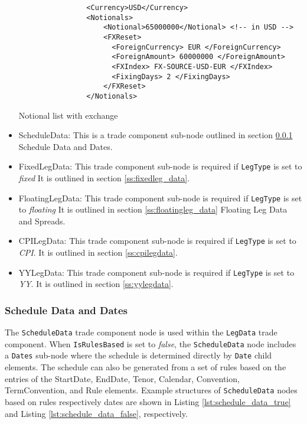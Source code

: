 \begin{itemize}
 \begin{listing}[H]
\begin{verbatim}
                <Currency>USD</Currency>
                <Notionals>
                    <Notional>65000000</Notional> <!-- in USD -->
                    <FXReset>
                      <ForeignCurrency> EUR </ForeignCurrency>
                      <ForeignAmount> 60000000 </ForeignAmount>
                      <FXIndex> FX-SOURCE-USD-EUR </FXIndex>
                      <FixingDays> 2 </FixingDays>
                    </FXReset>
                </Notionals>
\end{verbatim}
\caption{Notional list with exchange}
\label{lst:notional_fxreset}
\end{listing}


\item ScheduleData: This is a trade component sub-node outlined in section \ref{ss:schedule_data} Schedule Data and
Dates.
\item FixedLegData: This trade component sub-node is required if \lstinline!LegType! is set to \emph{fixed} It is
outlined in section \ref{ss:fixedleg_data}.
\item FloatingLegData: This trade component sub-node is required if \lstinline!LegType! is set to \emph{floating} It is
outlined in section \ref{ss:floatingleg_data} Floating Leg Data and Spreads.
\item CPILegData: This trade component sub-node is required if \lstinline!LegType! is set to \emph{CPI}. It is
  outlined in section \ref{ss:cpilegdata}.
\item YYLegData: This trade component sub-node is required if \lstinline!LegType! is set to \emph{YY}. It is
  outlined in section \ref{ss:yylegdata}.
\end{itemize}

\subsubsection{Schedule Data and Dates}\label{ss:schedule_data}

The \lstinline!ScheduleData! trade component node is used within the \lstinline!LegData! trade component. When
\lstinline!IsRulesBased! is set to \emph{false}, the \lstinline!ScheduleData! node includes a \lstinline!Dates! sub-node
where the schedule is determined directly by \lstinline!Date! child elements. The schedule can also be generated from a
set of rules based on the entries of the StartDate, EndDate, Tenor, Calendar, Convention, TermConvention, and Rule
elements.  Example structures of \lstinline!ScheduleData! nodes based on rules respectively dates are shown in Listing
\ref{lst:schedule_data_true} and Listing \ref{lst:schedule_data_false}, respectively.

